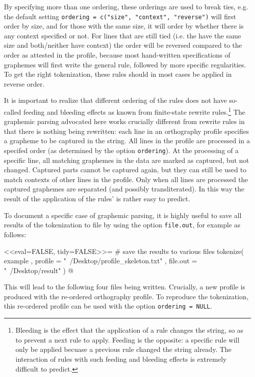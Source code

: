By specifying more than one ordering, these orderings are used to break ties,
e.g. the default setting \texttt{ordering = c("size", "context", "reverse")}
will first order by size, and for those with the same size, it will order by
whether there is any context specified or not. For lines that are still tied
(i.e. the have the same size and both/neither have context) the order will be
reversed compared to the order as attested in the profile, because most
hand-written specifications of graphemes will first write the general rule,
followed by more specific regularities. To get the right tokenization, these 
rules should in most cases be applied in reverse order.

It is important to realize that different ordering of the rules does not have
so-called feeding and bleeding effects as known from finite-state rewrite
rules.\footnote{Bleeding is the effect that the application of a rule changes
the string, so as to prevent a next rule to apply. Feeding is the opposite: a
specific rule will only be applied becuase a previous rule changed the string
already. The interaction of rules with such feeding and bleeding effects is
extremely difficult to predict.} The graphemic parsing advocated here works
crucially different from rewrite rules in that there is nothing being rewritten:
each line in an orthography profile specifies a grapheme to be captured in the 
string. All lines in the profile are processed in a specifed order (as determined
by the option \texttt{ordering}). At the processing of a specific line, all 
matching graphemes in the data are marked as captured, but not changed. 
Captured parts cannot be captured again, but they can still be used to match 
contexts of other lines in the profile. Only when all lines are processed the 
captured graphemes are separated (and possibly transliterated). In this way the 
result of the application of the rules' is rather easy to predict.

To document a specific case of graphemic parsing, it is highly useful to save
all results of the tokenization to file by using the option \texttt{file.out},
for example as follows: 

<<eval=FALSE, tidy=FALSE>>= 
# save the results to various files
tokenize( example
         , profile = "~/Desktop/profile_skeleton.txt"
         , file.out = "~/Desktop/result"
        )
@

This will lead to the following four files being written. Crucially, a
new profile is produced with the re-ordered orthography profile. To reproduce
the tokenization, this re-ordered profile can be used with the option
\texttt{ordering~=~NULL}.

